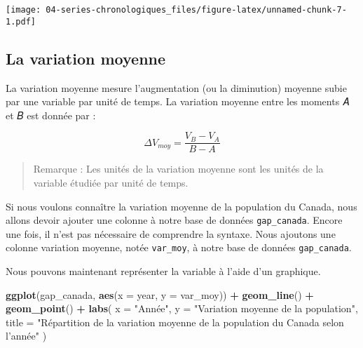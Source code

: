 \documentclass[]{book}
\newenvironment{Shaded}{\begin{snugshade}}{\end{snugshade}}
\newcommand{\KeywordTok}[1]{\textcolor[rgb]{0.13,0.29,0.53}{\textbf{#1}}}
\newcommand{\DataTypeTok}[1]{\textcolor[rgb]{0.13,0.29,0.53}{#1}}
\newcommand{\StringTok}[1]{\textcolor[rgb]{0.31,0.60,0.02}{#1}}
\newcommand{\OperatorTok}[1]{\textcolor[rgb]{0.81,0.36,0.00}{\textbf{#1}}}
\newcommand{\NormalTok}[1]{#1}
\begin{document}
\texttt{[image: 04-series-chronologiques\_files/figure-latex/unnamed-chunk-7-1.pdf]}

\subsection{La variation moyenne}\label{la-variation-moyenne}

La variation moyenne mesure l'augmentation (ou la diminution) moyenne
subie par une variable par unité de temps. La variation moyenne entre
les moments 𝐴 et 𝐵 est donnée par :

\begin{equation}
\Delta V_{moy} = \dfrac{V_B - V_A}{B-A}
\end{equation}

\begin{quote}
Remarque : Les unités de la variation moyenne sont les unités de la
variable étudiée par unité de temps.
\end{quote}

Si nous voulons connaître la variation moyenne de la population du
Canada, nous allons devoir ajouter une colonne à notre base de données
\texttt{gap\_canada}. Encore une fois, il n'est pas nécessaire de
comprendre la syntaxe. Nous ajoutons une colonne variation moyenne,
notée \texttt{var\_moy}, à notre base de données \texttt{gap\_canada}.

\begin{Shaded}
\end{Shaded}

Nous pouvons maintenant représenter la variable à l'aide d'un graphique.

\begin{Shaded}
\begin{Highlighting}[]
\KeywordTok{ggplot}\NormalTok{(gap_canada, }\KeywordTok{aes}\NormalTok{(}\DataTypeTok{x =}\NormalTok{ year, }\DataTypeTok{y =}\NormalTok{ var_moy)) }\OperatorTok{+}
\StringTok{  }\KeywordTok{geom_line}\NormalTok{() }\OperatorTok{+}
\StringTok{  }\KeywordTok{geom_point}\NormalTok{() }\OperatorTok{+}
\StringTok{  }\KeywordTok{labs}\NormalTok{(}
    \DataTypeTok{x =} \StringTok{"Année"}\NormalTok{,}
    \DataTypeTok{y =} \StringTok{"Variation moyenne de la population"}\NormalTok{,}
    \DataTypeTok{title =} \StringTok{"Répartition de la variation moyenne de la population du Canada selon l'année"}
\NormalTok{  )}
\end{Highlighting}
\end{Shaded}
\end{document}
